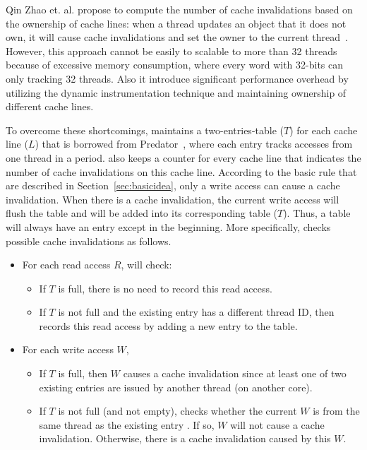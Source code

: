 Qin Zhao et. al. propose to compute the number of cache invalidations based on the ownership of cache lines: when a thread updates an object that it does not own, it will cause cache invalidations and set the owner to the current thread~\cite{qinzhao}. However, this approach cannot be easily to scalable to more than 32 threads because of excessive memory consumption, where every word with 32-bits can only tracking 32 threads. Also it introduce significant performance overhead by utilizing the dynamic instrumentation technique and maintaining ownership of different cache lines. 

To overcome these shortcomings, \Cheetah{} maintains a two-entries-table ($T$) for each cache line ($L$) that is borrowed from Predator~\cite{Predator}, where each entry tracks accesses from one thread in a period. \Cheetah{} also keeps a counter for every cache line that indicates the number of cache invalidations on this cache line.  
According to the basic rule that are described in Section~\ref{sec:basicidea}, only a write access can cause a cache invalidation. When there is a cache invalidation, the current write access will flush the table and will be added into its corresponding table ($T$). Thus, a table will always have an entry except in the beginning. More specifically, \cheetah{} checks possible cache invalidations as follows.
 
\begin{itemize}
\item
  For each read access $R$, \cheetah{} will check: 
  \begin{itemize}
    \item
      If $T$ is full, there is no need to record this read access.
    \item
      If $T$ is not full and the existing entry has a different thread ID, 
      then \cheetah{} records this read access by adding a new entry to the table.
  \end{itemize}
\item
  For each write access $W$,  
  \begin{itemize}
    \item
      If $T$ is full, then $W$ causes a cache invalidation since at least one of two existing entries are issued by another thread (on another core).
    \item
      If $T$ is not full (and not empty),
      \cheetah{} checks whether the current $W$ is from the same thread as the existing entry . If
      so, $W$ will not cause a cache invalidation. Otherwise, there is a cache invalidation caused by this $W$.
  \end{itemize}
\end{itemize}

